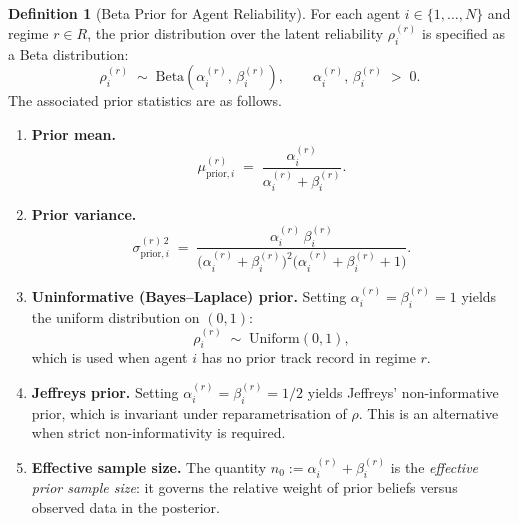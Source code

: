 \documentclass[12pt,openany]{book}
\numberwithin{equation}{chapter}
\theoremstyle{plain}
\theoremstyle{definition}
\newtheorem{definition}[theorem]{Definition}
\theoremstyle{remark}
\numberwithin{equation}{chapter}
\theoremstyle{plain}
\newcommand{\calR}{\mathcal{R}}
\def\calR{R}%
\begin{document}
\begin{definition}[Beta Prior for Agent Reliability]
\label{def:beta-prior}
For each agent $i \in \{1,\ldots,N\}$ and regime
$r \in \calR$, the prior distribution over the latent
reliability $\rho_i^{(r)}$ is specified as a Beta distribution:
\begin{equation}
  \rho_i^{(r)} \;\sim\;
  \mathrm{Beta}\!\left(\alpha_i^{(r)},\, \beta_i^{(r)}\right),
  \qquad \alpha_i^{(r)},\, \beta_i^{(r)} \;>\; 0.
  \label{eq:beta-prior}
\end{equation}
The associated prior statistics are as follows.
\begin{enumerate}
  \item[\textup{(i)}] \textbf{Prior mean.}
        \begin{equation}
          \mu_{\mathrm{prior},i}^{(r)}
          \;=\;
          \frac{\alpha_i^{(r)}}{\alpha_i^{(r)} + \beta_i^{(r)}}.
          \label{eq:prior-mean}
        \end{equation}

  \item[\textup{(ii)}] \textbf{Prior variance.}
        \begin{equation}
          \sigma_{\mathrm{prior},i}^{(r)\,2}
          \;=\;
          \frac{\alpha_i^{(r)}\,\beta_i^{(r)}}
               {\bigl(\alpha_i^{(r)} + \beta_i^{(r)}\bigr)^2
                \bigl(\alpha_i^{(r)} + \beta_i^{(r)} + 1\bigr)}.
          \label{eq:prior-variance}
        \end{equation}

  \item[\textup{(iii)}] \textbf{Uninformative (Bayes--Laplace)
        prior.}  Setting $\alpha_i^{(r)} = \beta_i^{(r)} = 1$
        yields the uniform distribution on $(0,1)$:
        \begin{equation}
          \rho_i^{(r)} \;\sim\; \mathrm{Uniform}(0,1),
          \label{eq:uniform-prior}
        \end{equation}
        which is used when agent $i$ has no prior track
        record in regime $r$.

  \item[\textup{(iv)}] \textbf{Jeffreys prior.}
        Setting $\alpha_i^{(r)} = \beta_i^{(r)} = 1/2$
        yields Jeffreys' non-informative prior, which is
        invariant under reparametrisation of $\rho$.  This
        is an alternative when strict non-informativity
        is required.

  \item[\textup{(v)}] \textbf{Effective sample size.}
        The quantity $n_0 := \alpha_i^{(r)} + \beta_i^{(r)}$
        is the \emph{effective prior sample size}: it governs
        the relative weight of prior beliefs versus
        observed data in the posterior.
\end{enumerate}
\end{definition}
\end{document}

